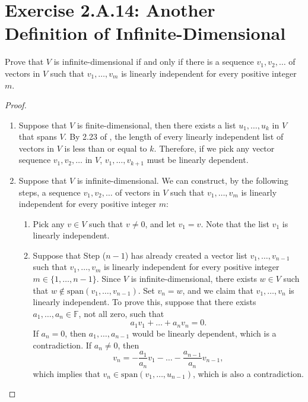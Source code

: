 \section{Exercise 2.A.14: Another Definition of Infinite-Dimensional}
\label{Exercise 2.A.14}
Prove that $V$ is infinite-dimensional if and only if there is a sequence $v_1,v_2,\dots$ of vectors in $V$ such that $v_1,\dots,v_m$ is linearly independent for every positive integer $m$.
\begin{proof}
\begin{enumerate}
\item Suppose that $V$ is finite-dimensional, then there exists a list $u_1,\dots,u_k$ in $V$ that spans $V$. By 2.23 of \cite{axler2014linear}, the length of every linearly independent list of vectors in $V$ is less than or equal to $k$. Therefore, if we pick any vector sequence $v_1,v_2,\dots$ in $V$, $v_1,\dots,v_{k+1}$ must be linearly dependent.

\item Suppose that $V$ is infinite-dimensional. We can construct, by the following steps, a sequence $v_1,v_2,\dots$ of vectors in $V$ such that $v_1,\dots,v_m$ is linearly independent for every positive integer $m$:
\begin{enumerate}
\item[Step (1):] Pick any $v\in V$ such that $v\ne 0$, and let $v_1=v$. Note that the list $v_1$ is linearly independent.
\item[Step ($n$):] Suppose that Step ($n-1$) has already created a vector list $v_1,\dots,v_{n-1}$ such that $v_1,\dots,v_m$ is linearly independent for every positive integer $m\in\{1,\dots,n-1\}$. Since $V$ is infinite-dimensional, there exists $w\in V$ such that $w\notin \text{span}(v_1,\dots,v_{n-1})$. Set $v_n=w$, and we claim that $v_1,\dots,v_n$ is linearly independent. To prove this, suppose that there exists $a_1,\dots,a_n\in\mathbb{F}$, not all zero, such that\[
a_1v_1+\dots+a_nv_n=0.
\]
If $a_n=0$, then $a_1,\dots,a_{n-1}$ would be linearly dependent, which is a contradiction. If $a_n\ne 0$, then\[
v_n=-\frac{a_1}{a_n}v_1-\dots-\frac{a_{n-1}}{a_n}v_{n-1},
\] which implies that $v_n\in\text{span}(v_1,\dots,u_{n-1})$, which is also a contradiction.
\end{enumerate}
\end{enumerate}
\end{proof}

